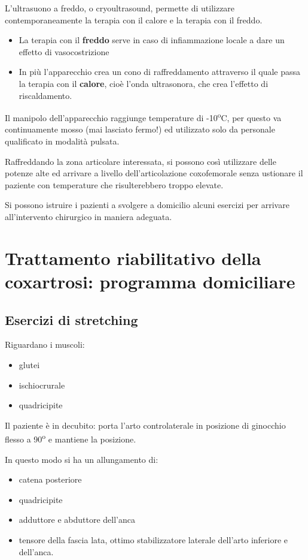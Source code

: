 L'ultrasuono a freddo, o cryoultrasound, permette di utilizzare
contemporaneamente la terapia con il calore e la terapia con il freddo.


\begin{itemize}
\item
  La terapia con il \textbf{freddo} serve in caso di infiammazione
  locale a dare un effetto di vasocostrizione
\item
  In più l'apparecchio crea un cono di raffreddamento attraverso il
  quale passa la terapia con il \textbf{calore}, cioè l'onda
  ultrasonora, che crea l'effetto di riscaldamento.
\end{itemize}


Il manipolo dell'apparecchio raggiunge temperature di -10\textsuperscript{o}C, per questo
va continuamente mosso (mai lasciato fermo!) ed utilizzato solo da
personale qualificato in modalità pulsata.

Raffreddando la zona articolare interessata, si possono così utilizzare
delle potenze alte ed arrivare a livello dell'articolazione coxofemorale
senza ustionare il paziente con temperature che risulterebbero troppo
elevate.

Si possono istruire i pazienti a svolgere a domicilio alcuni esercizi
per arrivare all'intervento chirurgico in maniera adeguata.

\section{Trattamento riabilitativo della coxartrosi: programma domiciliare}

\subsection{Esercizi di stretching}


Riguardano i muscoli:


\begin{itemize}
\item
  glutei
\item
  ischiocrurale
\item
  quadricipite
\end{itemize}


Il paziente è in decubito: porta l'arto controlaterale in posizione di
ginocchio flesso a 90\textsuperscript{o} e mantiene la posizione.

In questo modo si ha un allungamento di:


\begin{itemize}
\item
  catena posteriore
\item
  quadricipite
\item
  adduttore e abduttore dell'anca
\item
  tensore della fascia lata, ottimo stabilizzatore laterale dell'arto
  inferiore e dell'anca.
\end{itemize}

